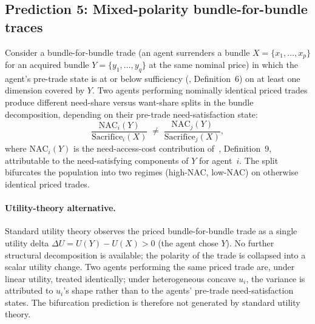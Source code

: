 \subsection{Prediction 5: Mixed-polarity bundle-for-bundle traces}
\label{sec:pred_mixed_polarity}

\begin{prediction}
\label{pred:mixed_polarity}
Consider a bundle-for-bundle trade (an agent surrenders a bundle
$X = \{x_1, \dots, x_p\}$ for an acquired bundle
$Y = \{y_1, \dots, y_q\}$ at the same nominal price) in which the
agent's pre-trade state is at or below sufficiency
(\citep[Need~Sufficiency]{lasser2026paper8b}, Definition~6) on at
least one dimension covered by $Y$.  Two agents performing
nominally identical priced trades produce different need-share
versus want-share splits in the bundle decomposition, depending
on their pre-trade need-satisfaction state:
\[
  \frac{\mathrm{NAC}_i(Y)}{\mathrm{Sacrifice}_i(X)}
  \;\neq\;
  \frac{\mathrm{NAC}_j(Y)}{\mathrm{Sacrifice}_j(X)},
\]
where $\mathrm{NAC}_i(Y)$ is the need-access-cost contribution
of~\citep[Need~Sufficiency]{lasser2026paper8b}, Definition~9,
attributable to the need-satisfying components of $Y$ for agent~$i$.
The split bifurcates the population into two regimes (high-NAC,
low-NAC) on otherwise identical priced trades.
\end{prediction}

\paragraph{Utility-theory alternative.}
Standard utility theory observes the priced bundle-for-bundle trade
as a single utility delta $\Delta U = U(Y) - U(X) > 0$ (the agent
chose $Y$).  No further structural decomposition is available;
the polarity of the trade is collapsed into a scalar utility
change.  Two agents performing the same priced trade are, under
linear utility, treated identically; under heterogeneous concave
$u_i$, the variance is attributed to $u_i$'s shape rather than to
the agents' pre-trade need-satisfaction states.  The bifurcation
prediction is therefore not generated by standard utility theory.

